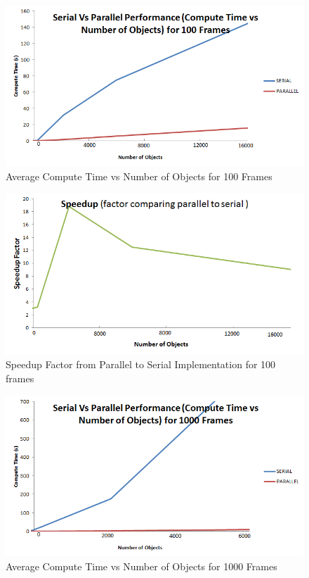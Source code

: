 \documentclass[12pt,openany,a4paper]{book}
\begin{document}
		\begin{figure}[H]
			\centering
			\caption{Average Compute Time vs Number of Objects for 100 Frames}
			\label{perfSer}
			\includegraphics[scale=0.7]{perfSer.png}
		\end{figure}
		
		\begin{figure}[H]
			\centering
			\caption{Speedup Factor from Parallel to Serial Implementation for 100 frames}
			\label{speedup}
			\includegraphics[scale=0.7]{speedup.png}
		\end{figure}
		
		\begin{figure}[H]
			\centering
			\caption{Average Compute Time vs Number of Objects for 1000 Frames}
			\label{perf1000}
			\includegraphics[scale=0.7]{perf1000.png}
		\end{figure}
		
\end{document}
